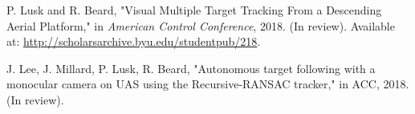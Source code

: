 

\renewcommand{\section}[2]{} %
\begin{thebibliography}{aa}

 P. Lusk and R. Beard, "Visual Multiple Target Tracking From a Descending Aerial Platform," in \textit{American Control Conference}, 2018. (In review). Available at: \url{http://scholarsarchive.byu.edu/studentpub/218}.

 J. Lee, J. Millard, P. Lusk, R. Beard, "Autonomous target following with a monocular camera on UAS using the Recursive-RANSAC tracker," in ACC, 2018. (In review).

\end{thebibliography}